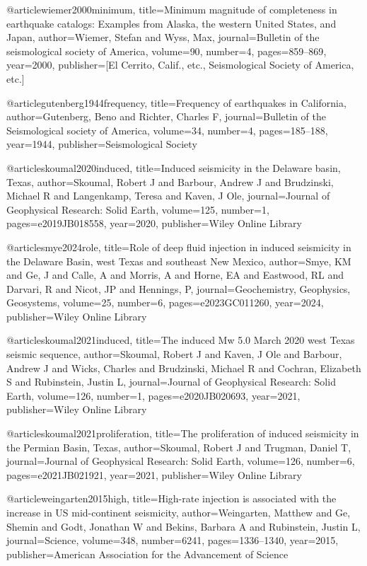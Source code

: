@article{wiemer2000minimum,
  title={Minimum magnitude of completeness in earthquake catalogs: Examples from Alaska, the western United States, and Japan},
  author={Wiemer, Stefan and Wyss, Max},
  journal={Bulletin of the seismological society of America},
  volume={90},
  number={4},
  pages={859--869},
  year={2000},
  publisher={[El Cerrito, Calif., etc., Seismological Society of America, etc.]}
}

@article{gutenberg1944frequency,
  title={Frequency of earthquakes in California},
  author={Gutenberg, Beno and Richter, Charles F},
  journal={Bulletin of the Seismological society of America},
  volume={34},
  number={4},
  pages={185--188},
  year={1944},
  publisher={Seismological Society}
}

@article{skoumal2020induced,
  title={Induced seismicity in the Delaware basin, Texas},
  author={Skoumal, Robert J and Barbour, Andrew J and Brudzinski, Michael R and Langenkamp, Teresa and Kaven, J Ole},
  journal={Journal of Geophysical Research: Solid Earth},
  volume={125},
  number={1},
  pages={e2019JB018558},
  year={2020},
  publisher={Wiley Online Library}
}

@article{smye2024role,
  title={Role of deep fluid injection in induced seismicity in the Delaware Basin, west Texas and southeast New Mexico},
  author={Smye, KM and Ge, J and Calle, A and Morris, A and Horne, EA and Eastwood, RL and Darvari, R and Nicot, JP and Hennings, P},
  journal={Geochemistry, Geophysics, Geosystems},
  volume={25},
  number={6},
  pages={e2023GC011260},
  year={2024},
  publisher={Wiley Online Library}
}

@article{skoumal2021induced,
  title={The induced Mw 5.0 March 2020 west Texas seismic sequence},
  author={Skoumal, Robert J and Kaven, J Ole and Barbour, Andrew J and Wicks, Charles and Brudzinski, Michael R and Cochran, Elizabeth S and Rubinstein, Justin L},
  journal={Journal of Geophysical Research: Solid Earth},
  volume={126},
  number={1},
  pages={e2020JB020693},
  year={2021},
  publisher={Wiley Online Library}
}

@article{skoumal2021proliferation,
  title={The proliferation of induced seismicity in the Permian Basin, Texas},
  author={Skoumal, Robert J and Trugman, Daniel T},
  journal={Journal of Geophysical Research: Solid Earth},
  volume={126},
  number={6},
  pages={e2021JB021921},
  year={2021},
  publisher={Wiley Online Library}
}

@article{weingarten2015high,
  title={High-rate injection is associated with the increase in US mid-continent seismicity},
  author={Weingarten, Matthew and Ge, Shemin and Godt, Jonathan W and Bekins, Barbara A and Rubinstein, Justin L},
  journal={Science},
  volume={348},
  number={6241},
  pages={1336--1340},
  year={2015},
  publisher={American Association for the Advancement of Science}
}


